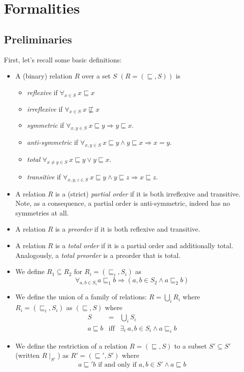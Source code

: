 \documentclass[12pt]{article}
\def\implies{\Rightarrow}
\theoremstyle{definition}
\theoremstyle{theorem}
\begin{document}
\section{Formalities}

\subsection{Preliminaries}

First, let's recall some basic definitions:
\begin{itemize}
\item A (binary) relation $R$ over a set $S$ \(\left(R=(\sqsubseteq,S)\right)\) is
  \begin{itemize}
  \item \emph{reflexive} if \(\forall_{x\in S}\:  x \sqsubseteq x\)
  \item \emph{irreflexive} if \(\forall_{x\in S}\:  x \not\sqsubseteq x\)
  \item \emph{symmetric} if \(\forall_{x,y \in S}\: x \sqsubseteq y \implies y \sqsubseteq x \).
  \item \emph{anti-symmetric} if \(\forall_{x,y \in S}\: x \sqsubseteq y \wedge y \sqsubseteq x \implies x = y\).
    \item \emph{total} \(\forall_{x \neq y \in S}\: x \sqsubseteq y \vee y \sqsubseteq x\).
  \item \emph{transitive} if \( \forall_{x,y,z \in S}\: x \sqsubseteq y \wedge y \sqsubseteq z \implies x \sqsubseteq z\).
  \end{itemize}
\item A relation $R$ is a (strict) \emph{partial order} if it is both irreflexive and transitive.
  Note, as a consequence, a partial order is anti-symmetric, indeed has no symmetries at all.
  \item A relation $R$ is a \emph{preorder} if it is both reflexive and transitive.
  \item A relation $R$ is a \emph{total order} if it is a partial order and additionally total.  Analogously, a \emph{total preorder} is a preorder that is total.
  \item We define $R_1 \subseteq R_2$ for \( R_i = (\sqsubseteq_i,S_i)\) as
    \[
    \forall_{a,b \in S_1} a \sqsubseteq_1 b \implies \left( a,b \in S_2 \wedge
    a \sqsubseteq_2 b \right)
    \]
  \item We define the union of a family of relations: \( R = \bigcup_i R_i
    \) where \( R_i = (\sqsubseteq_i, S_i) \) as \( (\sqsubseteq,S) \)
    where
    \begin{eqnarray*}
      S &=& \bigcup_i S_i \\
      a \sqsubseteq b &\textrm{iff}& \exists_i\: a,b \in S_i \wedge a
      \sqsubseteq_i b
    \end{eqnarray*}
    \item We define the restriction of a relation
      \(R=(\sqsubseteq,S)\) to a subset $S'\subseteq S'$ (written
      $R\mid_{S'}$) as \(R' =
      (\sqsubseteq',S')\) where
      \[
      a \sqsubseteq' b \textrm{ if and only if } a,b \in S' \wedge a
      \sqsubseteq b
      \]
\end{itemize}
\end{document}
